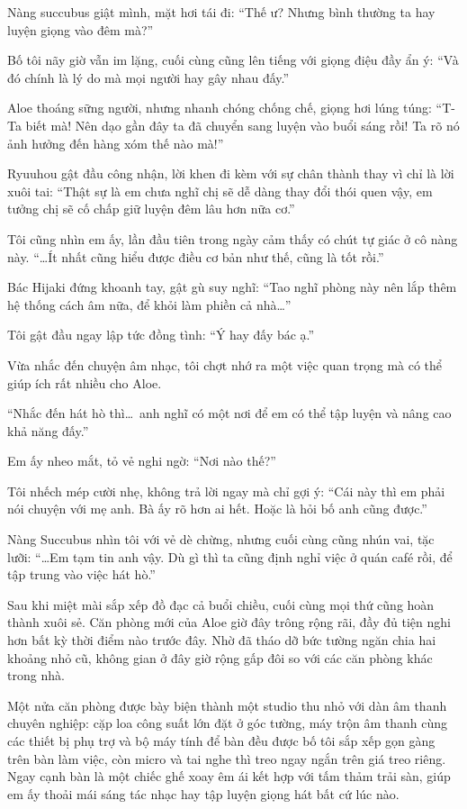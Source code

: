 \documentclass[../main.tex]{subfiles}
\begin{document}
Nàng succubus giật mình, mặt hơi tái đi: ``Thế ư? Nhưng bình thường ta hay luyện giọng vào đêm mà?''

Bố tôi nãy giờ vẫn im lặng, cuối cùng cũng lên tiếng với giọng điệu đầy ẩn ý: ``Và đó chính là lý do mà mọi người hay gây nhau đấy.''

Aloe thoáng sững người, nhưng nhanh chóng chống chế, giọng hơi lúng túng: ``T-Ta biết mà! Nên dạo gần đây ta đã chuyển sang luyện vào buổi sáng rồi! Ta rõ nó ảnh hưởng đến hàng xóm thế nào mà!''

Ryuuhou gật đầu công nhận, lời khen đi kèm với sự chân thành thay vì chỉ là lời xuôi tai: ``Thật sự là em chưa nghĩ chị sẽ dễ dàng thay đổi thói quen vậy, em tưởng chị sẽ cố chấp giữ luyện đêm lâu hơn nữa cơ.''

Tôi cũng nhìn em ấy, lần đầu tiên trong ngày cảm thấy có chút tự giác ở cô nàng này. ``\dots Ít nhất cũng hiểu được điều cơ bản như thế, cũng là tốt rồi.''

Bác Hijaki đứng khoanh tay, gật gù suy nghĩ: ``Tao nghĩ phòng này nên lắp thêm hệ thống cách âm nữa, để khỏi làm phiền cả nhà\dots''

Tôi gật đầu ngay lập tức đồng tình: ``Ý hay đấy bác ạ.''

Vừa nhắc đến chuyện âm nhạc, tôi chợt nhớ ra một việc quan trọng mà có thể giúp ích rất nhiều cho Aloe.

``Nhắc đến hát hò thì\dots\ anh nghĩ có một nơi để em có thể tập luyện và nâng cao khả năng đấy.''

Em ấy nheo mắt, tỏ vẻ nghi ngờ: ``Nơi nào thế?''

Tôi nhếch mép cười nhẹ, không trả lời ngay mà chỉ gợi ý: ``Cái này thì em phải nói chuyện với mẹ anh. Bà ấy rõ hơn ai hết. Hoặc là hỏi bố anh cũng được.''

Nàng Succubus nhìn tôi với vẻ dè chừng, nhưng cuối cùng cũng nhún vai, tặc lưỡi: ``\dots Em tạm tin anh vậy. Dù gì thì ta cũng định nghỉ việc ở quán café rồi, để tập trung vào việc hát hò.''

\ct

Sau khi miệt mài sắp xếp đồ đạc cả buổi chiều, cuối cùng mọi thứ cũng hoàn thành xuôi sẻ. Căn phòng mới của Aloe giờ đây trông rộng rãi, đầy đủ tiện nghi hơn bất kỳ thời điểm nào trước đây. Nhờ đã tháo dỡ bức tường ngăn chia hai khoảng nhỏ cũ, không gian ở đây giờ rộng gấp đôi so với các căn phòng khác trong nhà.

Một nửa căn phòng được bày biện thành một studio thu nhỏ với dàn âm thanh chuyên nghiệp: cặp loa công suất lớn đặt ở góc tường, máy trộn âm thanh cùng các thiết bị phụ trợ và bộ máy tính để bàn đều được bố tôi sắp xếp gọn gàng trên bàn làm việc, còn micro và tai nghe thì treo ngay ngắn trên giá treo riêng. Ngay cạnh bàn là một chiếc ghế xoay êm ái kết hợp với tấm thảm trải sàn, giúp em ấy thoải mái sáng tác nhạc hay tập luyện giọng hát bất cứ lúc nào.
\end{document}
